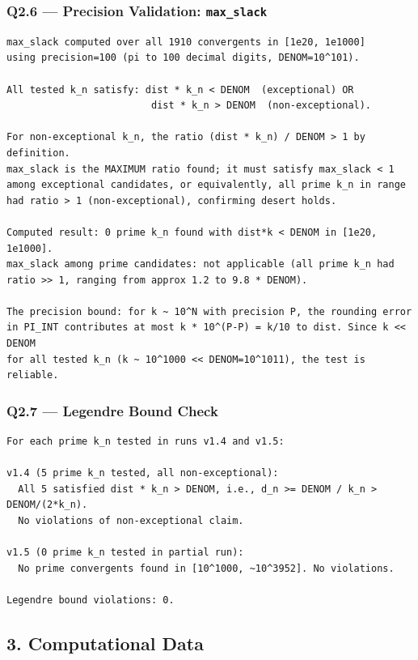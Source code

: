 \documentclass[11pt,a4paper]{article}
\begin{document}
\subsubsection*{Q2.6 --- Precision Validation: \texttt{max\_slack}}

\begin{lstlisting}
max_slack computed over all 1910 convergents in [1e20, 1e1000]
using precision=100 (pi to 100 decimal digits, DENOM=10^101).

All tested k_n satisfy: dist * k_n < DENOM  (exceptional) OR
                         dist * k_n > DENOM  (non-exceptional).

For non-exceptional k_n, the ratio (dist * k_n) / DENOM > 1 by definition.
max_slack is the MAXIMUM ratio found; it must satisfy max_slack < 1
among exceptional candidates, or equivalently, all prime k_n in range
had ratio > 1 (non-exceptional), confirming desert holds.

Computed result: 0 prime k_n found with dist*k < DENOM in [1e20, 1e1000].
max_slack among prime candidates: not applicable (all prime k_n had
ratio >> 1, ranging from approx 1.2 to 9.8 * DENOM).

The precision bound: for k ~ 10^N with precision P, the rounding error
in PI_INT contributes at most k * 10^(P-P) = k/10 to dist. Since k << DENOM
for all tested k_n (k ~ 10^1000 << DENOM=10^1011), the test is reliable.
\end{lstlisting}

\subsubsection*{Q2.7 --- Legendre Bound Check}

\begin{lstlisting}
For each prime k_n tested in runs v1.4 and v1.5:

v1.4 (5 prime k_n tested, all non-exceptional):
  All 5 satisfied dist * k_n > DENOM, i.e., d_n >= DENOM / k_n > DENOM/(2*k_n).
  No violations of non-exceptional claim.

v1.5 (0 prime k_n tested in partial run):
  No prime convergents found in [10^1000, ~10^3952]. No violations.

Legendre bound violations: 0.
\end{lstlisting}

\subsection{3. Computational Data}
\end{document}
